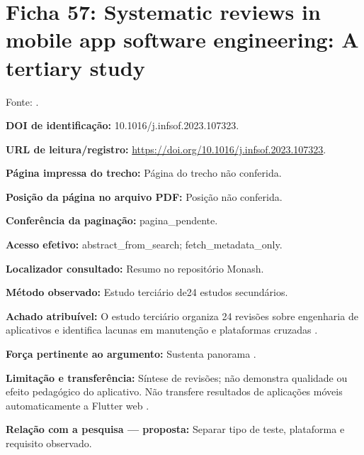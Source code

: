 \clearpage\section*{Ficha 57: Systematic reviews in mobile app software engineering: A tertiary study}

Fonte: \citet{eng04}.

\noindent\textbf{DOI de identificação:} 10.1016/j.infsof.2023.107323.\par\medskip

\noindent\textbf{URL de leitura/registro:} \url{https://doi.org/10.1016/j.infsof.2023.107323}.\par\medskip

\noindent\textbf{Página impressa do trecho:} Página do trecho não conferida.\par\medskip

\noindent\textbf{Posição da página no arquivo PDF:} Posição não conferida.\par\medskip

\noindent\textbf{Conferência da paginação:} pagina\_pendente.\par\medskip

\noindent\textbf{Acesso efetivo:} abstract\_from\_search; fetch\_metadata\_only.\par\medskip

\noindent\textbf{Localizador consultado:} Resumo no repositório Monash.\par\medskip

\noindent\textbf{Método observado:} Estudo terciário de24 estudos secundários.\par\medskip

\noindent\textbf{Achado atribuível:} O estudo terciário organiza 24 revisões sobre engenharia de aplicativos e identifica lacunas em manutenção e plataformas cruzadas \citep{eng04}.\par\medskip

\noindent\textbf{Força pertinente ao argumento:} Sustenta panorama \citep{eng04}.\par\medskip

\noindent\textbf{Limitação e transferência:} Síntese de revisões; não demonstra qualidade ou efeito pedagógico do aplicativo. Não transfere resultados de aplicações móveis automaticamente a Flutter web \citep{eng04}.\par\medskip

\noindent\textbf{Relação com a pesquisa — proposta:} Separar tipo de teste, plataforma e requisito observado.\par\medskip

